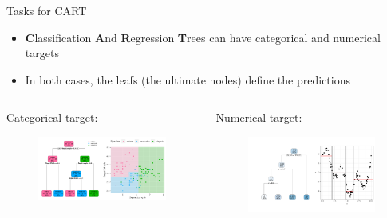 \documentclass[11pt,compress,t,notes=noshow, xcolor=table]{beamer}
\begin{document}
\begin{vbframe}{Tasks for CART}
  \begin{itemize}
    \item \textbf{C}lassification \textbf{A}nd \textbf{R}egression \textbf{T}rees can have categorical and numerical targets
    \item In both cases, the leafs (the ultimate nodes) define the predictions
  \end{itemize}
  
  \begin{columns}
\begin{column}{0.5\textwidth}
  Categorical target:
    \begin{figure}
    \centering
\includegraphics[width=0.99\textwidth, keepaspectratio]{figure/tree-classif-depth3.pdf}
    \end{figure}
\end{column}
\begin{column}{0.5\textwidth}
  Numerical target:
    \begin{figure}
    \centering
\includegraphics[width=0.99\textwidth, keepaspectratio]{figure/tree-regr-depth3.pdf}
    \end{figure}
\end{column}
\end{columns}
  
\end{vbframe}
\end{document}
